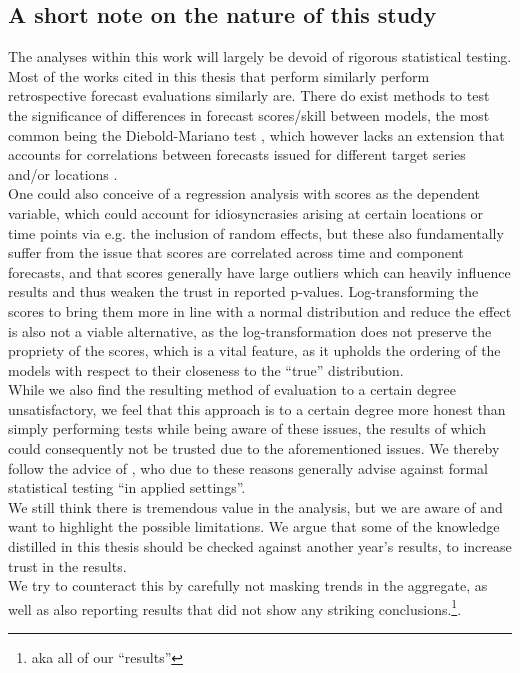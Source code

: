 \subsection{A short note on the nature of this study}
The analyses within this work will largely be devoid of rigorous statistical testing. Most of the works cited in this thesis that perform similarly perform retrospective forecast evaluations similarly are. There do exist methods to test the significance of differences in forecast scores/skill between models, the most common being the Diebold-Mariano test \citep{diebold_comparing_1995}, which however lacks an extension that accounts for correlations between forecasts issued for different target series and/or locations \citep{bracher_evaluating_2021}. \\
One could also conceive of a regression analysis with scores as the dependent variable, which could account for idiosyncrasies arising at certain locations or time points via e.g. the inclusion of random effects, but these also fundamentally suffer from the issue that scores are correlated across time and component forecasts, and that scores generally have large outliers which can heavily influence results and thus weaken the trust in reported p-values. Log-transforming the scores to bring them more in line with a normal distribution and reduce the effect is also not a viable alternative, as the log-transformation does not preserve the propriety of the scores, which is a vital feature, as it upholds the ordering of the models with respect to their closeness to the ``true'' distribution.\\ 
While we also find the resulting method of evaluation to a certain degree unsatisfactory, we feel that this approach is to a certain degree more honest than simply performing tests while being aware of these issues, the results of which could consequently not be trusted due to the aforementioned issues. We thereby follow the advice of \cite{bosse_evaluating_2022}, who due to these reasons generally advise against formal statistical testing ``in applied settings''.\\ 
We still think there is tremendous value in the analysis, but we are aware of and want to highlight the possible limitations. We argue that some of the knowledge distilled in this thesis should be checked against another year's results, to increase trust in the results. \\ 
We try to counteract this by carefully not masking trends in the aggregate, as well as also reporting results that did not show any striking conclusions.\footnote{aka all of our ``results''}. %
